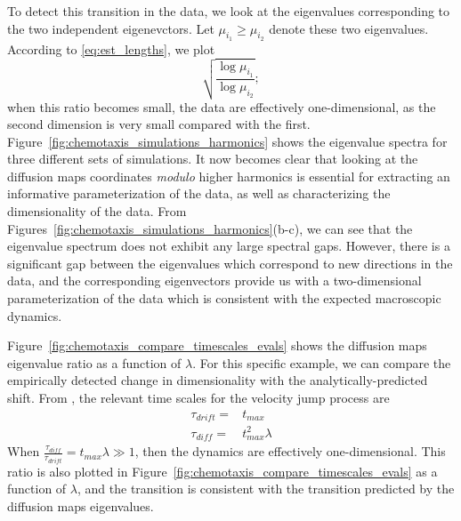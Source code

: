 \documentclass[preprint]{elsarticle}
\begin{document}
To detect this transition in the data, we look at the eigenvalues corresponding to the two independent eigenevctors. 
%
Let $\mu_{i_1} \ge \mu_{i_2}$ denote these two eigenvalues. 
%
According to \eqref{eq:est_lengths}, we plot  
\begin{equation}
 \sqrt{\frac{\log \mu_{i_1}}{\log \mu_{i_2}}} ;
\end{equation}
when this ratio becomes small, the data are effectively one-dimensional, as the second dimension is very small compared with the first. 
%
Figure~\ref{fig:chemotaxis_simulations_harmonics} shows the eigenvalue spectra for three different sets of simulations. 
%
It now becomes clear that looking at the diffusion maps coordinates {\em modulo} higher harmonics is essential for extracting an informative parameterization of the data, as well as characterizing the dimensionality of the data. 
%
From Figures~\ref{fig:chemotaxis_simulations_harmonics}(b-c), we can see that the eigenvalue spectrum does not exhibit any large spectral gaps.
%
However, there is a significant gap between the eigenvalues which correspond to new directions in the data, and the corresponding eigenvectors provide us with a two-dimensional parameterization of the data which is consistent with the expected macroscopic dynamics. 



Figure~\ref{fig:chemotaxis_compare_timescales_evals} shows the diffusion maps eigenvalue ratio as a function of $\lambda$. 
%
For this specific example, we can compare the empirically detected change in dimensionality with the analytically-predicted shift. 
%
From \cite{othmer2000diffusion}, the relevant time scales for the velocity jump process are
%
\begin{equation}
\begin{aligned}
\tau_{drift} =& t_{max} \\
\tau_{diff} =& t_{max}^2 \lambda
\end{aligned}
\end{equation}
%
When $\frac{\tau_{diff}}{\tau_{drift}} =  t_{max}  \lambda \gg 1$, then the dynamics are effectively one-dimensional. 
%
This ratio is also plotted in Figure~\ref{fig:chemotaxis_compare_timescales_evals} as a function of $\lambda$, and the transition is consistent with the transition predicted by the diffusion maps eigenvalues. 
\end{document}
